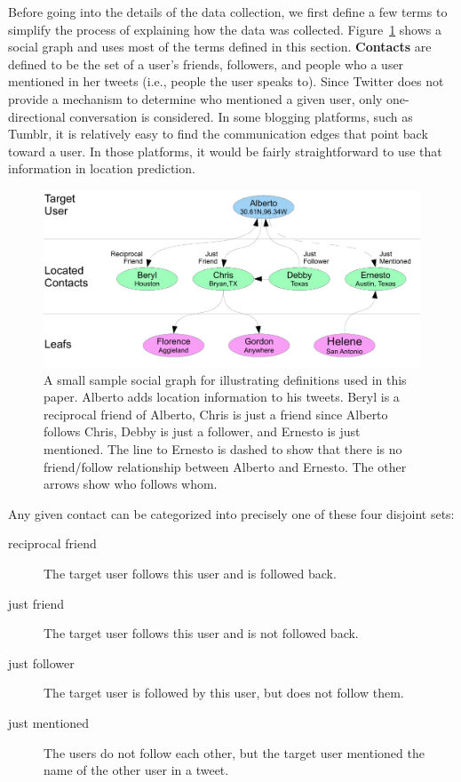 

Before going into the details of the data collection, we first define a few
terms to simplify the process of explaining how the data was collected.
%
Figure~\ref{fig:Terms} shows a social graph and uses most of the terms
defined in this section.
%
\textbf{Contacts} are defined to be the set of a user's friends, followers, and
people who a user mentioned in her tweets (i.e., people the user speaks to).
%
Since Twitter does not provide a mechanism to determine who mentioned a given
user, only one-directional conversation is considered.
%
In some blogging platforms, such as Tumblr, it is relatively easy to find the
communication edges that point back toward a user.
%
In those platforms, it would be fairly straightforward to use that information
in location prediction.

\begin{figure}[tbh]
\centering
\includegraphics[width=\linewidth]{figures/terms.pdf}
\caption{
A small sample social graph for illustrating definitions used in this paper.
Alberto adds location information to his tweets.
Beryl is a reciprocal friend of Alberto, Chris is just a friend since Alberto
follows Chris, Debby is just a follower, and Ernesto is just mentioned.
The line to Ernesto is dashed to show that there is no friend/follow
relationship between Alberto and Ernesto.
The other arrows show who follows whom.
}
\label{fig:Terms}
\end{figure}

Any given contact can be categorized into precisely one of these four disjoint
sets:
\begin{description}
\item[reciprocal friend] The target user follows this user and is followed
    back.
\item[just friend] The target user follows this user and is not followed
    back.
\item[just follower] The target user is followed by this user, but does
    not follow them.
\item[just mentioned] The users do not follow each other, but the target
    user mentioned the name of the other user in a tweet.
\end{description}

